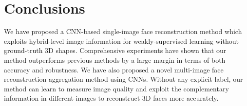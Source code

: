\documentclass[10pt,twocolumn,letterpaper]{article}
\begin{document}
\section{Conclusions}
We have proposed a CNN-based single-image face reconstruction method which exploits hybrid-level image information for weakly-supervised learning without ground-truth 3D shapes. Comprehensive experiments have shown that our method outperforms previous methods by a large margin in terms of both accuracy and robustness. We have also proposed a novel multi-image face reconstruction aggregation method using CNNs. Without any explicit label, our method can learn to measure image quality and exploit the complementary information in different images to reconstruct 3D faces more accurately.

{\small
	
	
}
	
\end{document}
